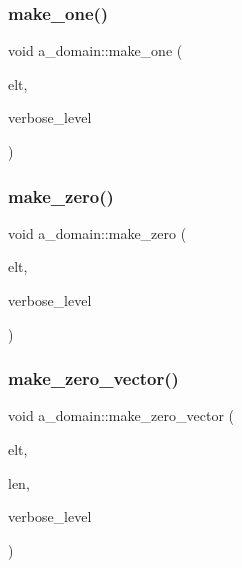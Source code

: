 \subsubsection{\texorpdfstring{make\+\_\+one()}{make\_one()}}
{\footnotesize\ttfamily void a\+\_\+domain\+::make\+\_\+one (\begin{DoxyParamCaption}\item[{\mbox{\hyperlink{galois_8h_a09fddde158a3a20bd2dcadb609de11dc}{I\+NT}} $\ast$}]{elt,  }\item[{\mbox{\hyperlink{galois_8h_a09fddde158a3a20bd2dcadb609de11dc}{I\+NT}}}]{verbose\+\_\+level }\end{DoxyParamCaption})}

\mbox{\label{classa__domain_a3a01cffc84b77049af781f6c314f7a75}} 
\subsubsection{\texorpdfstring{make\+\_\+zero()}{make\_zero()}}
{\footnotesize\ttfamily void a\+\_\+domain\+::make\+\_\+zero (\begin{DoxyParamCaption}\item[{\mbox{\hyperlink{galois_8h_a09fddde158a3a20bd2dcadb609de11dc}{I\+NT}} $\ast$}]{elt,  }\item[{\mbox{\hyperlink{galois_8h_a09fddde158a3a20bd2dcadb609de11dc}{I\+NT}}}]{verbose\+\_\+level }\end{DoxyParamCaption})}

\mbox{\label{classa__domain_a9eaa89bc3512e04e8c3d9e5feb6c7dcb}} 
\subsubsection{\texorpdfstring{make\+\_\+zero\+\_\+vector()}{make\_zero\_vector()}}
{\footnotesize\ttfamily void a\+\_\+domain\+::make\+\_\+zero\+\_\+vector (\begin{DoxyParamCaption}\item[{\mbox{\hyperlink{galois_8h_a09fddde158a3a20bd2dcadb609de11dc}{I\+NT}} $\ast$}]{elt,  }\item[{\mbox{\hyperlink{galois_8h_a09fddde158a3a20bd2dcadb609de11dc}{I\+NT}}}]{len,  }\item[{\mbox{\hyperlink{galois_8h_a09fddde158a3a20bd2dcadb609de11dc}{I\+NT}}}]{verbose\+\_\+level }\end{DoxyParamCaption})}


